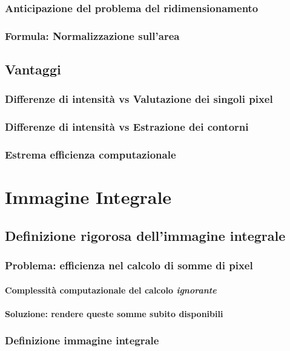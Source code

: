             \subsubsection{Anticipazione del problema del ridimensionamento}
            \subsubsection{Formula: Normalizzazione sull'area}
        \subsection{Vantaggi}
            \subsubsection{Differenze di intensità vs Valutazione dei singoli pixel}
            \subsubsection{Differenze di intensità vs Estrazione dei contorni}
            \subsubsection{Estrema efficienza computazionale}
    \section{Immagine Integrale}
    \label{sec:integral_image}
        \subsection{Definizione rigorosa dell'immagine integrale}
            \subsubsection{Problema: efficienza nel calcolo di somme di pixel}
                \paragraph{Complessità computazionale del calcolo \emph{ignorante}}
                \paragraph{Soluzione: rendere queste somme subito disponibili}
            \subsubsection{Definizione immagine integrale}
